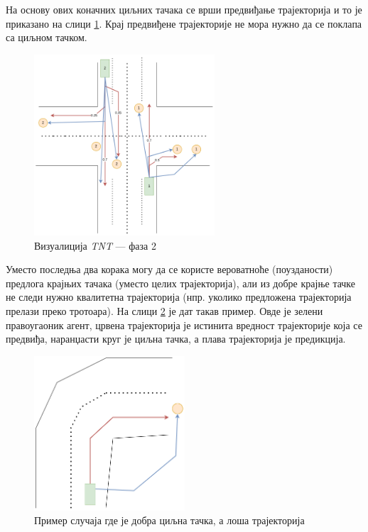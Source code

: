 \documentclass[11pt,oneside]{memoir}
\begin{document}
На основу ових коначних циљних тачака се врши предвиђање трајекторија и то је приказано на слици \ref{tnt-viz-2}. Крај предвиђене трајекторије не мора
нужно да се поклапа са циљном тачком.

\begin{figure}[H]
  \centering
  \includegraphics[width=0.6\textwidth]{images/tnt-viz-Page-2.drawio.png}
  \caption{Визуалиција \textit{TNT} --- фаза 2 \label{tnt-viz-2}}
\end{figure}

Уместо последња два корака могу да се користе вероватноће (поузданости) предлога крајњих тачака (уместо целих трајекторија),
али из добре крајње тачке не следи
нужно квалитетна трајекторија (нпр. уколико предложена трајекторија прелази преко тротоара). На слици \ref{tnt-good-target-bad-traj}
је дат такав пример. Овде је зелени правоугаоник агент, црвена трајекторија је истинита вредност трајекторије која се предвиђа, 
наранџасти круг је циљна тачка, а плава трајекторија је предикција. 

\begin{figure}[H]
  \centering
  \includegraphics[width=0.5\textwidth]{images/tnt-good-end-point-and-bad-traj.drawio.png}
  \caption{Пример случаја где је добра циљна тачка, а лоша трајекторија \label{tnt-good-target-bad-traj}}
\end{figure}
\end{document}
